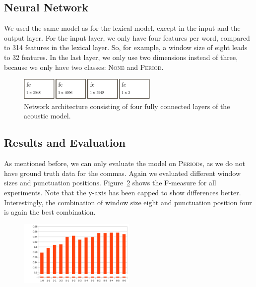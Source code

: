 \subsection{Neural Network}

We used the same model as for the lexical model, except in the input and the output layer.
For the input layer, we only have four features per word, compared to 314 features in the lexical layer.
So, for example, a window size of eight leads to 32 features.
In the last layer, we only use two dimensions instead of three, because we only have two classes: \textsc{None} and \textsc{Period}.

\begin{figure}[ht]
    \centering
    \includegraphics[width=0.6\textwidth]{img/net_acoustic.pdf}
    \caption{Network architecture consisting of four fully connected layers of the acoustic model.}
    \label{fig:net_acoustic}
\end{figure}


\subsection{Results and Evaluation}

As mentioned before, we can only evaluate the model on \textsc{Period}s, as we do not have ground truth data for the commas.
Again we evaluated different window sizes and punctuation positions.
Figure~\ref{audio_eval} shows the F-measure for all experiments.
Note that the y-axis has been capped to show differences better.
Interestingly, the combination of window size eight and punctuation position four is again the best combination.

\begin{figure}[ht]
    \centering
    \includegraphics[width=0.5\textwidth]{img/audio_parameter_eval.png}
    \caption{}
    \label{audio_eval}
\end{figure}
